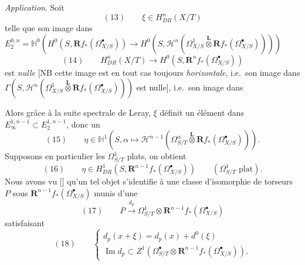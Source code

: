 \documentclass[11pt,a4paper]{article}
\begin{document}
\struck{\ill{}} \emph{Application}. Soit  
\[
(13) \qquad \xi \in H^{n}_{DR}(X/T)
\]
telle que son image dans $E^{0,n}_{2} = \mathbb{H}^{0}(H^{0}(S, \mathbf{R}f_{*}(\Omega^{\bullet}_{X/S})) \to H^{0}(S, \mathcal{H}^{n}(\Omega^{1}_{X/S} \overset{\mathbf{L}}{\otimes} \mathbf{R}f_{*}(\Omega^{\bullet}_{X/S}))))$ \struck{\ill{}} 
\[
(14) \qquad H^{n}_{DR}(X/T) \to H^{0}(S, \mathbf{R}^{n}f_{*}(\Omega^{\bullet}_{X/S}))
\]
est \emph{nulle} [NB cette image est en tout cas toujours \emph{horizontale}, i.e.\ son image dans $\Gamma(S, \mathcal{H}^{n}(\Omega^{1}_{X/S} \overset{\mathbf{L}}{\otimes} \mathbf{R}f_{*}(\Omega^{\bullet}_{X/S})))$ est nulle], i.e.\ son image dans

Alors grâce à la suite spectrale de Leray, $\xi$ définit un élément dans $E^{1,n-1}_{\infty} \subset E^{1,n-1}_{2}$, donc un
\[
(15) \qquad \eta \in \mathbb{H}^{1}(S, \alpha \mapsto \mathcal{H}^{n-1}(\Omega^{\alpha}_{S/T} \overset{\mathbf{L}}{\otimes} \mathbf{R}f_{*}(\Omega^{\bullet}_{X/S}))) .
\]
Supposons en particulier les $\Omega^{1}_{S/T}$ plats,   on obtient
\[
(16) \qquad \eta \in H^{1}_{DR}(S, \mathbf{R}^{n-1}f_{*}(\Omega^{\bullet}_{X/S})) \qquad (\Omega^{1}_{S/T} \text{ plat}) .
\]
Nous avons vu [\ill{}] qu'un tel objet s'identifie à une classe d'isomorphie de torseurs $P$ sous $\mathbf{R}^{n-1}f_{*}(\Omega^{\bullet}_{X/S})$ munis d'une 
\[
(17) \qquad P \xrightarrow{d_{p}} \Omega^{1}_{S/T} \otimes \mathbf{R}^{n-1}f_{*}(\Omega^{\bullet}_{X/S})
\]
satisfaisant
\[
(18) \qquad \begin{cases} d_{p}(x+\xi) = d_{p}(x) + d^{0}(\xi) \\ \operatorname{Im} d_{p} \subset Z^{1}(\Omega^{\bullet}_{S/T} \otimes \mathbf{R}^{n-1}f_{*}(\Omega^{\bullet}_{X/S})) . \end{cases}
\]
\end{document}
